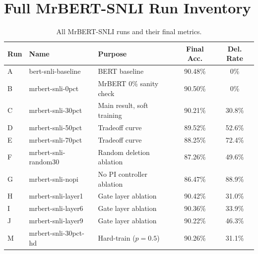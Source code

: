 \documentclass[11pt,a4paper]{article}
\begin{document}
\section{Full MrBERT-SNLI Run Inventory}
\label{app:runs}

\begin{table}[h]
\centering\small
\begin{tabular}{@{}lllcc@{}}
\toprule
\textbf{Run} & \textbf{Name} & \textbf{Purpose} & \textbf{Final Acc.} & \textbf{Del. Rate} \\
\midrule
A & bert-snli-baseline       & BERT baseline              & 90.48\% & 0\% \\
B & mrbert-snli-0pct         & MrBERT 0\% sanity check    & 90.50\% & 0\% \\
C & mrbert-snli-30pct        & Main result, soft training & 90.21\% & 30.8\% \\
D & mrbert-snli-50pct        & Tradeoff curve             & 89.52\% & 52.6\% \\
E & mrbert-snli-70pct        & Tradeoff curve             & 88.25\% & 72.4\% \\
F & mrbert-snli-random30     & Random deletion ablation   & 87.26\% & 49.6\% \\
G & mrbert-snli-nopi         & No PI controller ablation  & 86.47\% & 88.9\% \\
H & mrbert-snli-layer1       & Gate layer ablation        & 90.42\% & 31.0\% \\
I & mrbert-snli-layer6       & Gate layer ablation        & 90.36\% & 33.9\% \\
J & mrbert-snli-layer9       & Gate layer ablation        & 90.22\% & 46.3\% \\
M & mrbert-snli-30pct-hd     & Hard-train ($p=0.5$)       & 90.26\% & 31.1\% \\
\bottomrule
\end{tabular}
\caption{All MrBERT-SNLI runs and their final metrics.}
\label{tab:run-inventory}
\end{table}
\end{document}
